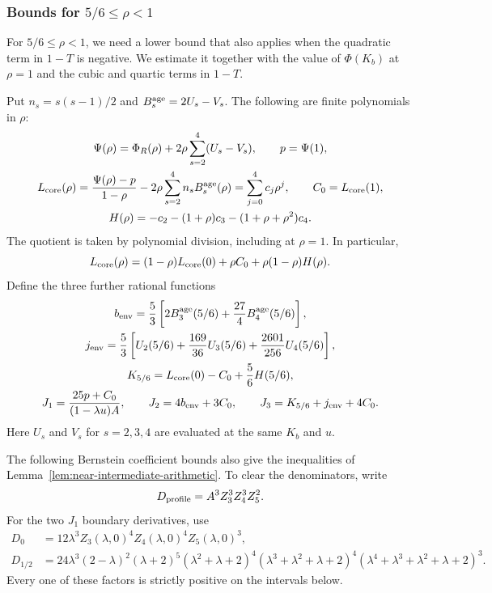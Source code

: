 \subsubsection{Bounds for \texorpdfstring{$5/6\le\rho<1$}{5/6 <= rho < 1}}
For $5/6\le\rho<1$, we need a lower bound that also applies when the quadratic term in $1-T$ is negative. We estimate it together with the value of $\Phi(K_b)$ at $\rho=1$ and the cubic and quartic terms in $1-T$.

Put $n_s=s(s-1)/2$ and $B_s^{\rm age}=2U_s-V_s$. The following are finite polynomials in $\rho$:
\begin{equation}\label{eq:near-core-defs}
\begin{gathered}
 \Psi(\rho)=\Phi_R(\rho)+2\rho\sum_{s=2}^4(U_s-V_s),\qquad p=\Psi(1),\\
 L_{\rm core}(\rho)=\frac{\Psi(\rho)-p}{1-\rho}
                       -2\rho\sum_{s=2}^4n_s B_s^{\rm age}(\rho)
                   =\sum_{j=0}^4c_j\rho^j,\qquad C_0=L_{\rm core}(1),\\
 H(\rho)=-c_2-(1+\rho)c_3-(1+\rho+\rho^2)c_4.
\end{gathered}
\end{equation}
The quotient is taken by polynomial division, including at $\rho=1$. In particular,
\begin{equation}\label{eq:near-core-chord}
 L_{\rm core}(\rho)=(1-\rho)L_{\rm core}(0)+\rho C_0+
                         \rho(1-\rho)H(\rho).
\end{equation}
Define the three further rational functions
\begin{equation}\label{eq:near-recovery-defs}
\begin{gathered}
 b_{\rm env}=\frac53\left[2B_3^{\rm age}(5/6)+\frac{27}{4}B_4^{\rm age}(5/6)\right],\\
 j_{\rm env}=\frac53\left[U_2(5/6)+\frac{169}{36}U_3(5/6)
                                  +\frac{2601}{256}U_4(5/6)\right],\\
 K_{5/6}=L_{\rm core}(0)-C_0+\frac56H(5/6),\\
 J_1=\frac{25p+C_0}{(1-\lambda u)A},\qquad
 J_2=4b_{\rm env}+3C_0,\qquad
 J_3=K_{5/6}+j_{\rm env}+4C_0.
\end{gathered}
\end{equation}
Here $U_s$ and $V_s$ for $s=2,3,4$ are evaluated at the same $K_b$ and $u$.

The following Bernstein coefficient bounds also give the inequalities of Lemma~\ref{lem:near-intermediate-arithmetic}. To clear the denominators, write
\[
 D_{\rm profile}=A^3Z_3^3Z_4^3Z_5^2.
\]
For the two $J_1$ boundary derivatives, use
\[
\begin{split}
 D_0&=12\lambda^3 Z_3(\lambda,0)^4Z_4(\lambda,0)^4Z_5(\lambda,0)^3,\\
 D_{1/2}&=24\lambda^3(2-\lambda)^2(\lambda+2)^5
 (\lambda^2+\lambda+2)^4(\lambda^3+\lambda^2+\lambda+2)^4
 (\lambda^4+\lambda^3+\lambda^2+\lambda+2)^3.
\end{split}
\]
Every one of these factors is strictly positive on the intervals below.

